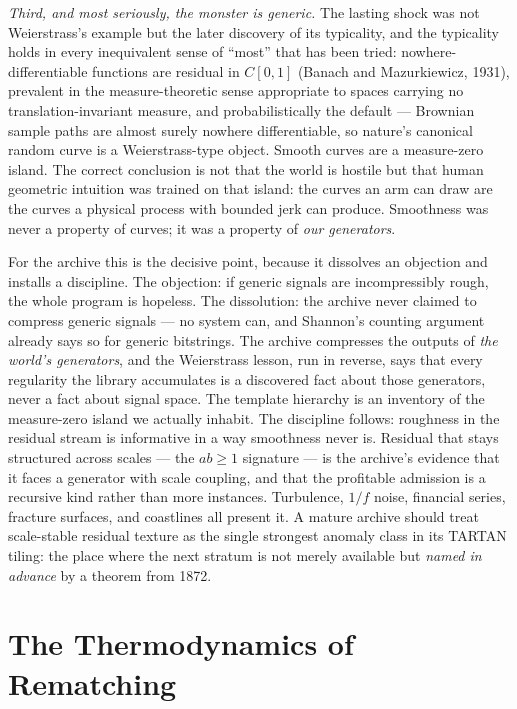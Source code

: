 \documentclass[11pt,oneside]{book}
\theoremstyle{remark}
\begin{document}
\emph{Third, and most seriously, the monster is generic.} The lasting
shock was not Weierstrass's example but the later discovery of its
typicality, and the typicality holds in every inequivalent sense of
``most'' that has been tried: nowhere-differentiable functions are
residual in $C[0,1]$ (Banach and Mazurkiewicz, 1931), prevalent in the
measure-theoretic sense appropriate to spaces carrying no
translation-invariant measure, and probabilistically the default ---
Brownian sample paths are almost surely nowhere differentiable, so
nature's canonical random curve is a Weierstrass-type object. Smooth
curves are a measure-zero island. The correct conclusion is not that
the world is hostile but that human geometric intuition was trained on
that island: the curves an arm can draw are the curves a physical
process with bounded jerk can produce. Smoothness was never a property
of curves; it was a property of \emph{our generators}.

For the archive this is the decisive point, because it dissolves an
objection and installs a discipline. The objection: if generic signals
are incompressibly rough, the whole program is hopeless. The
dissolution: the archive never claimed to compress generic signals ---
no system can, and Shannon's counting argument already says so for
generic bitstrings. The archive compresses the outputs of \emph{the
world's generators}, and the Weierstrass lesson, run in reverse, says
that every regularity the library accumulates is a discovered fact
about those generators, never a fact about signal space. The template
hierarchy is an inventory of the measure-zero island we actually
inhabit. The discipline follows: roughness in the residual stream is
informative in a way smoothness never is. Residual that stays
structured across scales --- the $ab \ge 1$ signature --- is the
archive's evidence that it faces a generator with scale coupling, and
that the profitable admission is a recursive kind rather than more
instances. Turbulence, $1/f$ noise, financial series, fracture
surfaces, and coastlines all present it. A mature archive should treat
scale-stable residual texture as the single strongest anomaly class in
its TARTAN tiling: the place where the next stratum is not merely
available but \emph{named in advance} by a theorem from 1872.

\chapter{The Thermodynamics of Rematching}
\end{document}
